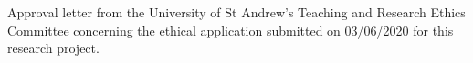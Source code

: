 Approval letter from the University of St Andrew's Teaching and Research Ethics Committee concerning the ethical application submitted on 03/06/2020 for this research project.

\clearpage
